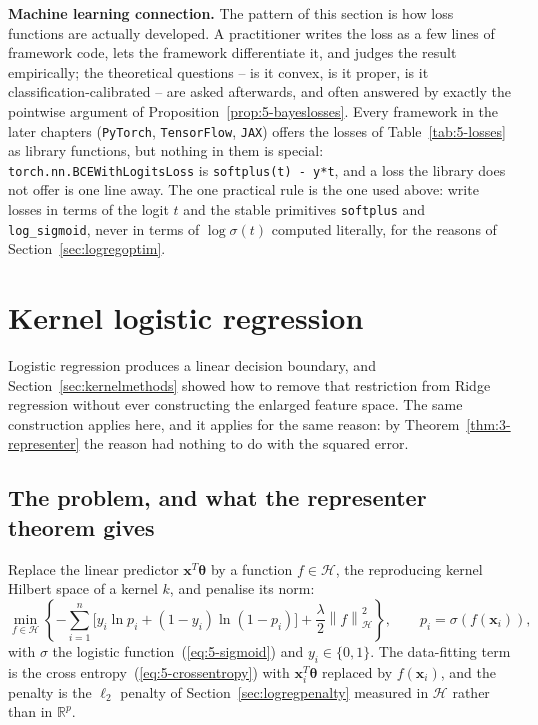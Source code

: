 \begin{notebox}
\textbf{Machine learning connection.}  The pattern of this section is how
loss functions are actually developed.  A practitioner writes the loss as a
few lines of framework code, lets the framework differentiate it, and judges
the result empirically; the theoretical questions -- is it convex, is it
proper, is it classification-calibrated -- are asked afterwards, and often
answered by exactly the pointwise argument of
Proposition~\ref{prop:5-bayeslosses}.  Every framework in the later chapters
(\texttt{PyTorch}, \texttt{TensorFlow}, \texttt{JAX}) offers the losses of
Table~\ref{tab:5-losses} as library functions, but nothing in them is
special: \texttt{torch.nn.BCEWithLogitsLoss} is \texttt{softplus(t) - y*t},
and a loss the library does not offer is one line away.  The one practical
rule is the one used above: write losses in terms of the logit $t$ and the
stable primitives \texttt{softplus} and \texttt{log\_sigmoid}, never in terms
of $\log\sigma(t)$ computed literally, for the reasons of
Section~\ref{sec:logregoptim}.
\end{notebox}

\section{Kernel logistic regression}
\label{sec:kernellogreg}

Logistic regression produces a linear decision boundary, and
Section~\ref{sec:kernelmethods} showed how to remove that restriction from
Ridge regression without ever constructing the enlarged feature space.  The
same construction applies here, and it applies for the same reason: by
Theorem~\ref{thm:3-representer} the reason had nothing to do with the squared
error.

\subsection{The problem, and what the representer theorem gives}
\label{sec:klogregsetup}

Replace the linear predictor $\bm{x}^{T}\bm{\theta}$ by a function
$f\in\mathcal{H}$, the reproducing kernel Hilbert space of a kernel $k$, and
penalise its norm:
\begin{equation}
  \min_{f\in\mathcal{H}}\left\{
    -\sum_{i=1}^{n}\Big[y_i\ln p_i + (1-y_i)\ln(1-p_i)\Big]
    + \frac{\lambda}{2}\left\|f\right\|_{\mathcal{H}}^{2}\right\},
  \qquad
  p_i = \sigma\!\left(f(\bm{x}_i)\right),
  \label{eq:5-klogregproblem}
\end{equation}
with $\sigma$ the logistic function~(\ref{eq:5-sigmoid}) and $y_i\in\{0,1\}$.
The data-fitting term is the cross entropy~(\ref{eq:5-crossentropy}) with
$\bm{x}_i^{T}\bm{\theta}$ replaced by $f(\bm{x}_i)$, and the penalty is the
$\ell_2$ penalty of Section~\ref{sec:logregpenalty} measured in $\mathcal{H}$
rather than in $\mathbb{R}^{p}$.

